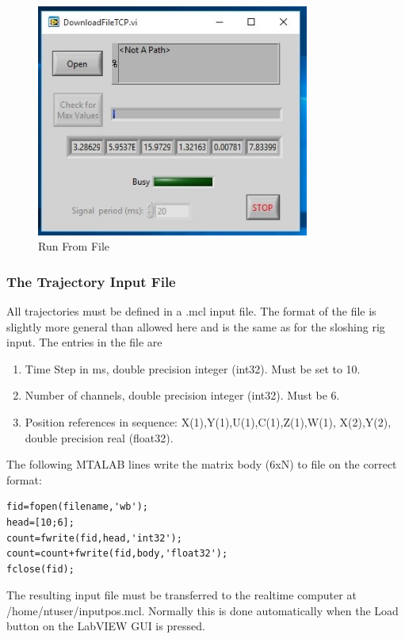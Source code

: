\documentclass[a4paper,english]{report}
\begin{document}
\begin{figure}[htb!]
	\centering \includegraphics[width=0.8\textwidth]{fig/towing_runfromfile}
	\caption{Run From File}
	\label{fig: Towing main-1}
\end{figure}


\subsubsection*{The Trajectory Input File}

All trajectories must be defined in a .mcl input file. The format of the file is slightly more general than allowed here and is the same as for the sloshing rig input. The entries in the file are
\begin{enumerate}
	\item Time Step in ms, double precision integer (int32). Must be set to 10.
	\item Number of channels, double precision integer (int32). Must be 6.
	\item Position references in sequence: X(1),Y(1),U(1),C(1),Z(1),W(1), X(2),Y(2), double precision real (float32).
\end{enumerate}
The following MTALAB lines write the matrix body (6xN) to file on
the correct format:
\begin{verbatim}
fid=fopen(filename,'wb');
head=[10;6];
count=fwrite(fid,head,'int32');
count=count+fwrite(fid,body,'float32');
fclose(fid); 
\end{verbatim}

The resulting input file must be transferred to the realtime computer at /home/ntuser/inputpos.mcl. Normally this is done automatically when the Load button on the LabVIEW GUI is pressed. 
\end{document}
